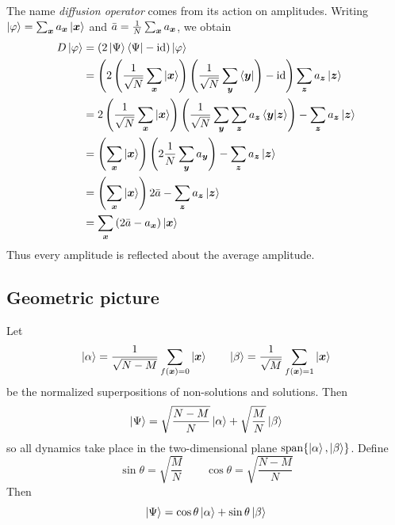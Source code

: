 The name \emph{diffusion operator} comes from its action on amplitudes.
Writing
\(
\ket{\varphi}=\sum_{{\boldsymbol{x}}} a_{{\boldsymbol{x}}}\ket{{\boldsymbol{x}}}
\)
and
\(
\bar a=\frac1N\sum_{{\boldsymbol{x}}}a_{{\boldsymbol{x}}}
\),
we obtain
\[
\begin{aligned}
D\ket{\varphi}
&=
\left(2\ket{\Psi}\bra{\Psi}-\operatorname{id}\right)\ket{\varphi}
\\
&=
\left(
2\left(\frac{1}{\sqrt N}\sum_{{\boldsymbol{x}}}\ket{{\boldsymbol{x}}}\right)\left(\frac{1}{\sqrt N}\sum_{{\boldsymbol{y}}}\bra{{\boldsymbol{y}}}\right)-\operatorname{id}
\right)
\sum_{{\boldsymbol{z}}} a_{{\boldsymbol{z}}}\ket{{\boldsymbol{z}}}
\\
&=
2
\left(\frac{1}{\sqrt N}
\sum_{{\boldsymbol{x}}}\ket{{\boldsymbol{x}}}
\right)
\left(
  \frac{1}{\sqrt N}\sum_{{\boldsymbol{y}}}
  \sum_{{\boldsymbol{z}}} a_{{\boldsymbol{z}}}\braket{{\boldsymbol{y}}|{\boldsymbol{z}}}
\right)
-
\sum_{{\boldsymbol{z}}} a_{{\boldsymbol{z}}}\ket{{\boldsymbol{z}}}
\\
&=
\left(
\sum_{{\boldsymbol{x}}}\ket{{\boldsymbol{x}}}
\right)
\left(
  2\frac{1}{N}\sum_{{\boldsymbol{y}}} a_{{\boldsymbol{y}}}
\right)
-
\sum_{{\boldsymbol{z}}} a_{{\boldsymbol{z}}}\ket{{\boldsymbol{z}}}
\\
&=
\left(
\sum_{{\boldsymbol{x}}}\ket{{\boldsymbol{x}}}
\right)
2
\bar{a}
-
\sum_{{\boldsymbol{z}}} a_{{\boldsymbol{z}}}\ket{{\boldsymbol{z}}}
\\
&=
\sum_{{\boldsymbol{x}}}
\left(
2\bar a-a_{{\boldsymbol{x}}}
\right)
\ket{{\boldsymbol{x}}}
\end{aligned}
\]
Thus every amplitude is reflected about the average amplitude.

\subsection{Geometric picture}

Let
\[
\ket{\alpha}
=
\frac{1}{\sqrt{N-M}}
\sum_{f({\boldsymbol{x}})=0}\ket{{\boldsymbol{x}}}
\qquad
\ket{\beta}
=
\frac{1}{\sqrt M}
\sum_{f({\boldsymbol{x}})=1}\ket{{\boldsymbol{x}}}
\]
be the normalized superpositions of non-solutions and solutions.
Then
\[
\ket{\Psi}
=
\sqrt{\frac{N-M}{N}}\ket{\alpha}
+
\sqrt{\frac{M}{N}}\ket{\beta}
\]
so all dynamics take place in the two-dimensional plane
\(
\operatorname{span}\{\ket{\alpha},\ket{\beta}\}
\).
Define
\begin{equation}\label{eq:grover-angle}
\sin\theta
=
\sqrt{\frac{M}{N}}
\qquad
\cos\theta
=
\sqrt{\frac{N-M}{N}}
\end{equation}
Then
\begin{equation}\label{eq:grover-initial-state-angle}
\ket{\Psi}
=
\cos\theta\ket{\alpha}
+
\sin\theta\ket{\beta}
\end{equation}

